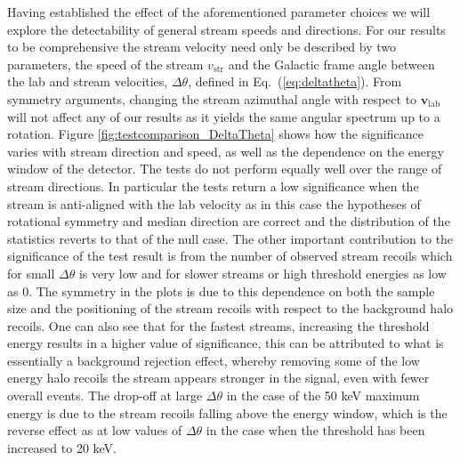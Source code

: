 Having established the effect of the aforementioned parameter choices we will explore the detectability of general stream speeds and directions. For our results to be comprehensive the stream velocity need only be described by two parameters, the speed of the stream $v_\textrm{str}$ and the Galactic frame angle between the lab and stream velocities, $\Delta \theta$, defined in Eq.~(\ref{eq:deltatheta}). From symmetry arguments, changing the stream azimuthal angle with respect to $\textbf{v}_\textrm{lab}$ will not affect any of our results as it yields the same angular spectrum up to a rotation. Figure \ref{fig:testcomparison_DeltaTheta} shows how the significance varies with stream direction and speed, as well as the dependence on the energy window of the detector. The tests do not perform equally well over the range of stream directions. In particular the tests return a low significance when the stream is anti-aligned with the lab velocity as in this case the hypotheses of rotational symmetry and median direction are correct and the distribution of the statistics reverts to that of the null case. The other important contribution to the significance of the test result is from the number of observed stream recoils which for small $\Delta\theta$ is very low and for slower streams or high threshold energies as low as 0. The symmetry in the plots is due to this dependence on both the sample size and the positioning of the stream recoils with respect to the background halo recoils. One can also see that for the fastest streams, increasing the threshold energy results in a higher value of significance, this can be attributed to what is essentially a background rejection effect, whereby removing some of the low energy halo recoils the stream appears stronger in the signal, even with fewer overall events. The drop-off at large $\Delta\theta$ in the case of the 50 keV maximum energy is due to the stream recoils falling above the energy window, which is the reverse effect as at low values of $\Delta\theta$ in the case when the threshold has been increased to 20 keV.

